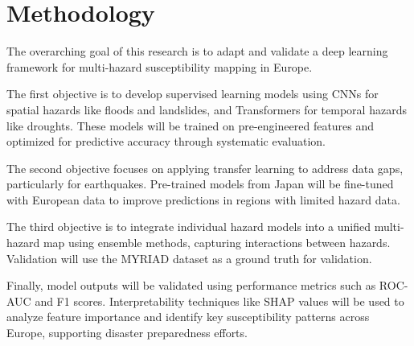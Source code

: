 \section{Methodology}
\label{sec:methodology}
The overarching goal of this research is to adapt and validate a deep learning framework for multi-hazard susceptibility mapping in Europe. 

The first objective is to develop supervised learning models using CNNs for spatial hazards like floods and landslides, and Transformers for temporal hazards like droughts. These models will be trained on pre-engineered features and optimized for predictive accuracy through systematic evaluation.

The second objective focuses on applying transfer learning to address data gaps, particularly for earthquakes. Pre-trained models from Japan will be fine-tuned with European data to improve predictions in regions with limited hazard data.

The third objective is to integrate individual hazard models into a unified multi-hazard map using ensemble methods, capturing interactions between hazards. Validation will use the MYRIAD dataset as a ground truth for validation.

Finally, model outputs will be validated using performance metrics such as ROC-AUC and F1 scores. Interpretability techniques like SHAP values will be used to analyze feature importance and identify key susceptibility patterns across Europe, supporting disaster preparedness efforts.